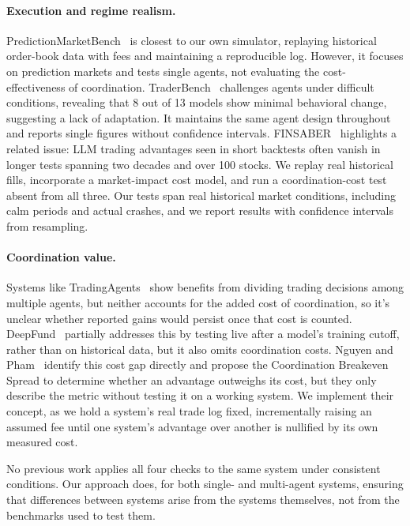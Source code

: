 \documentclass{article}
\begin{document}
\paragraph{Execution and regime realism.} PredictionMarketBench~\cite{arora2026} is closest to our own simulator, replaying historical order-book data with fees and maintaining a reproducible log. However, it focuses on prediction markets and tests single agents, not evaluating the cost-effectiveness of coordination. TraderBench~\cite{yuan2026traderbench} challenges agents under difficult conditions, revealing that 8 out of 13 models show minimal behavioral change, suggesting a lack of adaptation. It maintains the same agent design throughout and reports single figures without confidence intervals. FINSABER~\cite{li2025finsaber} highlights a related issue: LLM trading advantages seen in short backtests often vanish in longer tests spanning two decades and over 100 stocks. We replay real historical fills, incorporate a market-impact cost model, and run a coordination-cost test absent from all three. Our tests span real historical market conditions, including calm periods and actual crashes, and we report results with confidence intervals from resampling.

\paragraph{Coordination value.} Systems like TradingAgents~\cite{xiao2024ta} show benefits from dividing trading decisions among multiple agents, but neither accounts for the added cost of coordination, so it's unclear whether reported gains would persist once that cost is counted. DeepFund~\cite{li2025deepfund} partially addresses this by testing live after a model's training cutoff, rather than on historical data, but it also omits coordination costs. Nguyen and Pham~\cite{nguyen2026} identify this cost gap directly and propose the Coordination Breakeven Spread to determine whether an advantage outweighs its cost, but they only describe the metric without testing it on a working system. We implement their concept, as we hold a system's real trade log fixed, incrementally raising an assumed fee until one system's advantage over another is nullified by its own measured cost.

No previous work applies all four checks to the same system under consistent conditions. Our approach does, for both single- and multi-agent systems, ensuring that differences between systems arise from the systems themselves, not from the benchmarks used to test them.
\end{document}
